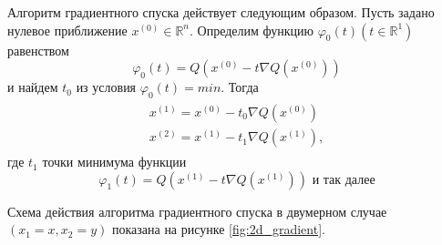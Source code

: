 Алгоритм градиентного спуска действует следующим образом. Пусть задано нулевое приближение $x^{(0)} \in \mathbb{R}^n$. Определим функцию $\varphi_0(t) (t \in \mathbb{R}^1)$ равенством
\begin{equation} \label{eq:8.7}
	\varphi_0(t) = Q(x^{(0)} - t\nabla Q(x^{(0)})) 
\end{equation}
и найдем $t_0$ из условия $\varphi_0(t) = min$. Тогда
\begin{align}
	\begin{split} \label{eq:8.8}
		x^{(1)} = x^{(0)} - t_0\nabla Q(x^{(0)}) \\
		x^{(2)} = x^{(1)} - t_1\nabla Q(x^{(1)}),
	\end{split}
\end{align}
где $t_1$ точки минимума функции
\begin{equation} \label{eq:8.9}
	\varphi_1(t) = Q(x^{(1)} - t\nabla Q(x^{(1)})) \textrm{ и так далее}
\end{equation}

Схема действия алгоритма градиентного спуска в двумерном случае $(x_1 = x, x_2 = y)$ показана на рисунке \ref{fig:2d_gradient}.


